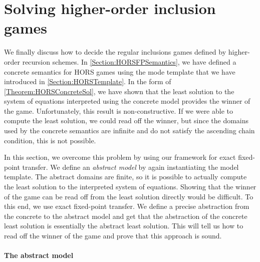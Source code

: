 \documentclass[../../diss.tex]{subfiles}
\begin{document}
\section{Solving higher-order inclusion games}%
\label{Section:HORSSolving}

We finally discuss how to decide the regular inclusions games defined by higher-order recursion schemes.
In \cref{Section:HORSFPSemantics}, we have defined a concrete semantics for HORS games using the mode template that we have introduced in \cref{Section:HORSTemplate}.
In the form of \cref{Theorem:HORSConcreteSol}, we have shown that the least solution to the system of equations interpreted using the concrete model provides the winner of the game.
Unfortunately, this result is non-constructive.
If we were able to compute the least solution, we could read off the winner, but since the domains used by the concrete semantics are infinite and do not satisfy the ascending chain condition, this is not possible.

In this section, we overcome this problem by using our framework for exact fixed-point transfer.
We define an \emph{abstract model} by again instantiating the model template.
The abstract domains are finite, so it is possible to actually compute the least solution to the interpreted system of equations.
Showing that the winner of the game can be read off from the least solution directly would be difficult.
To this end, we use exact fixed-point transfer.
We define a precise abstraction from the concrete to the abstract model and get that the abstraction of the concrete least solution is essentially the abstract least solution.
This will tell us how to read off the winner of the game and prove that this approach is sound.

\paragraph{The abstract model}
\end{document}
